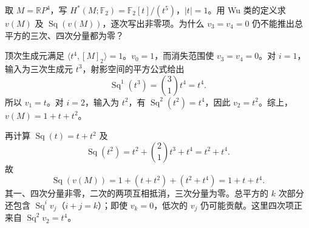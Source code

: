 \begin{exercise}\label{g2:ex:wu-real-projective-four}
	取 \(M=\mathbb RP^4\)，写 \(H^*(M;\mathbb F_2)=\mathbb F_2[t]/(t^5)\)，\(|t|=1\)。用 Wu 类的定义求 \(v(M)\) 及 \(\operatorname{Sq}(v(M))\)，逐次写出非零项。为什么 \(v_3=v_4=0\) 仍不能推出总平方的三次、四次分量都为零？
\end{exercise}
\begin{solution}
	顶次生成元满足 \(\langle t^4,[M]_2\rangle=1\)。\(v_0=1\)，而消失范围使 \(v_3=v_4=0\)。对 \(i=1\)，输入为三次生成元 \(t^3\)，射影空间的平方公式给出
	\[
		\operatorname{Sq}^1(t^3)=\binom31t^4=t^4.
	\]
	所以 \(v_1=t\)。对 \(i=2\)，输入为 \(t^2\)，有 \(\operatorname{Sq}^2(t^2)=t^4\)，因此 \(v_2=t^2\)。综上，\(v(M)=1+t+t^2\)。

	再计算 \(\operatorname{Sq}(t)=t+t^2\) 及
	\[
		\operatorname{Sq}(t^2)=t^2+\binom21t^3+t^4=t^2+t^4.
	\]
	故
	\[
		\operatorname{Sq}(v(M))=1+(t+t^2)+(t^2+t^4)=1+t+t^4.
	\]
	其一、四次分量非零，二次的两项互相抵消，三次分量为零。总平方的 \(k\) 次部分还包含 \(\operatorname{Sq}^i v_j\)（\(i+j=k\)）；即使 \(v_k=0\)，低次的 \(v_j\) 仍可能贡献。这里四次项正来自 \(\operatorname{Sq}^2v_2=t^4\)。
\end{solution}
